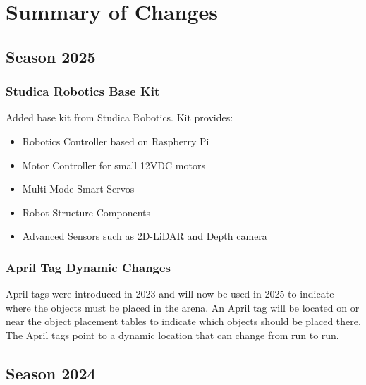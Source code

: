 
\chapter{Summary of Changes}

\begin{comment}
This chapter provides an overview for experienced teams that know the rules and just need an update on what is new for the specific year. 
All new teams are strongly advised to read the whole rule book thoroughly.
\end{comment}

\section{Season 2025}

\subsection{Studica Robotics Base Kit}

Added base kit from Studica Robotics. Kit provides:

\begin{itemize}
	\item Robotics Controller based on Raspberry Pi 
	\item Motor Controller for small 12VDC motors
	\item Multi-Mode Smart Servos
	\item Robot Structure Components
	\item Advanced Sensors such as 2D-LiDAR and Depth camera
\end{itemize}

\subsection{April Tag Dynamic Changes}

April tags were introduced in 2023 and will now be used in 2025 to indicate where the objects must be placed in the arena. An April tag will be located on or near the object placement tables to indicate which objects should be placed there. The April tags point to a dynamic location that can change from run to run.

\section{Season 2024}

